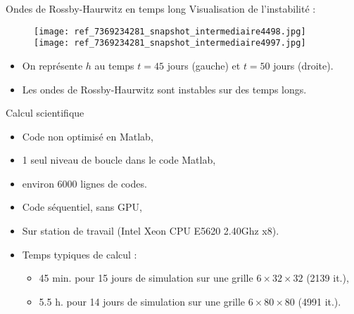 \documentclass[11pt]{beamer}
\begin{document}
\begin{frame}{Ondes de Rossby-Haurwitz en temps long}
Visualisation de l'instabilité :
\begin{figure}
\texttt{[image: ref\_7369234281\_snapshot\_intermediaire4498.jpg]}
\texttt{[image: ref\_7369234281\_snapshot\_intermediaire4997.jpg]}
\end{figure}
\begin{itemize}
\item On représente $h$ au temps $t=45$ jours (gauche) et $t=50$ jours (droite).
\item Les ondes de Rossby-Haurwitz sont instables sur des temps longs.
\end{itemize}
\end{frame}

























\begin{frame}{Calcul scientifique}
\begin{block}{}
\begin{itemize}
\item Code non optimisé en Matlab,
\item 1 seul niveau de boucle dans le code Matlab,
\item environ 6000 lignes de codes.
\end{itemize}
\end{block}

\begin{block}{}
\begin{itemize}
\item Code séquentiel, sans GPU,
\item Sur station de travail (Intel Xeon CPU E5620 2.40Ghz x8).
\item Temps typiques  de calcul :
\begin{itemize}
\item 45 min. pour 15 jours de simulation sur une grille $6 \times 32 \times 32$ (2139 it.),
\item 5.5 h. pour 14 jours de simulation sur une grille $6 \times 80 \times 80$ (4991 it.).
\end{itemize}
\end{itemize}
\end{block}
\end{frame}
\end{document}
